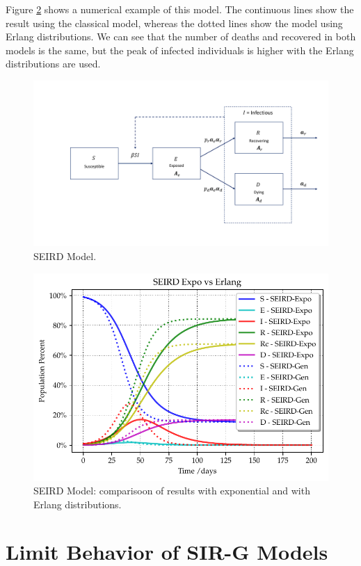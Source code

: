 \documentclass[USenglish,10pt]{article}
\begin{document}
Figure \ref{fg:seird} shows a numerical example of this model. The continuous lines show the result using the classical model, whereas the dotted lines show the model using Erlang distributions. We can see that the number of deaths and recovered in both models is the same, but the peak of infected individuals is higher with the Erlang distributions are used.

\begin{figure}
    \centering
    \includegraphics[width=0.9\linewidth]{figures/SEIRDPic}
    \caption[SEIRD Model]{SEIRD Model.}
    \label{fg:seird_pic}
\end{figure}


\begin{figure}
    \centering
    \includegraphics[width=0.9\linewidth]{figures/SEIRD}
    \caption[SEIRD Model]{SEIRD Model: comparisoon of results with exponential and with Erlang distributions.}
    \label{fg:seird}
\end{figure}

\section{Limit Behavior of SIR-G Models} \label{sc:limit}
\end{document}
